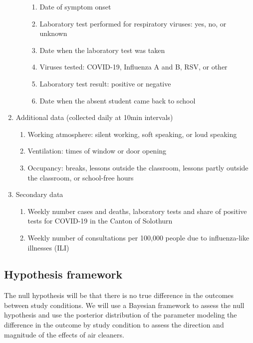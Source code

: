 \documentclass{article}
\begin{document}
\begin{enumerate}
\begin{enumerate}
\begin{enumerate}
            \item Date of symptom onset
            \item Laboratory test performed for respiratory viruses: yes, no, or unknown
            \item Date when the laboratory test was taken
            \item Viruses tested: COVID-19, Influenza A and B, RSV, or other
            \item Laboratory test result: positive or negative
            \item Date when the absent student came back to school
        \end{enumerate}
    \end{enumerate}
    \item Additional data (collected daily at 10min intervals)
    \begin{enumerate}
        \item Working atmosphere: silent working, soft speaking, or loud speaking 
        \item Ventilation: times of window or door opening
        \item Occupancy: breaks, lessons outside the classroom, lessons partly outside the classroom, or school-free hours
    \end{enumerate}
    \item Secondary data
    \begin{enumerate}
        \item Weekly number cases and deaths, laboratory tests and share of positive tests for COVID-19 in the Canton of Solothurn \cite{FOPH2023-cases}
        \item Weekly number of consultations per 100,000 people due to influenza-like illnesses (ILI) \cite{FOPH2023-consultations}
    \end{enumerate}
\end{enumerate}

\subsection{Hypothesis framework}

The null hypothesis will be that there is no true difference in the outcomes between study conditions. We will use a Bayesian framework to assess the null hypothesis and use the posterior distribution of the parameter modeling the difference in the outcome by study condition to assess the direction and magnitude of the effects of air cleaners. 
\end{document}

